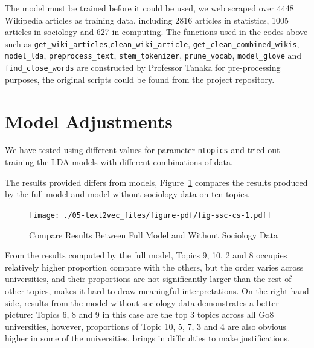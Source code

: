 \documentclass[
  letterpaper,
  DIV=11,
  numbers=noendperiod]{scrreport}
\begin{document}
The model must be trained before it could be used, we web scraped over
4448 Wikipedia articles as training data, including 2816 articles in
statistics, 1005 articles in sociology and 627 in computing. The
functions used in the codes above such as
\texttt{get\_wiki\_articles},\texttt{clean\_wiki\_article},
\texttt{get\_clean\_combined\_wikis}, \texttt{model\_lda},
\texttt{preprocess\_text}, \texttt{stem\_tokenizer},
\texttt{prune\_vocab}, \texttt{model\_glove} and
\texttt{find\_close\_words} are constructed by Professor Tanaka for
pre-processing purposes, the original scripts could be found from the
\href{https://github.com/numbats/datasci-courses}{project repository}.

\hypertarget{model-adjustments}{%
\section*{Model Adjustments}\label{model-adjustments}}

We have tested using different values for parameter \texttt{ntopics} and
tried out training the LDA models with different combinations of data.

The results provided differs from models, Figure~\ref{fig-ssc-cs}
compares the results produced by the full model and model without
sociology data on ten topics.

\begin{figure}

{\centering \texttt{[image: ./05-text2vec\_files/figure-pdf/fig-ssc-cs-1.pdf]}

}

\caption{\label{fig-ssc-cs}Compare Results Between Full Model and
Without Sociology Data}

\end{figure}

From the results computed by the full model, Topics 9, 10, 2 and 8
occupies relatively higher proportion compare with the others, but the
order varies across universities, and their proportions are not
significantly larger than the rest of other topics, makes it hard to
draw meaningful interpretations. On the right hand side, results from
the model without sociology data demonstrates a better picture: Topics
6, 8 and 9 in this case are the top 3 topics across all Go8
universities, however, proportions of Topic 10, 5, 7, 3 and 4 are also
obvious higher in some of the universities, brings in difficulties to
make justifications.
\end{document}
